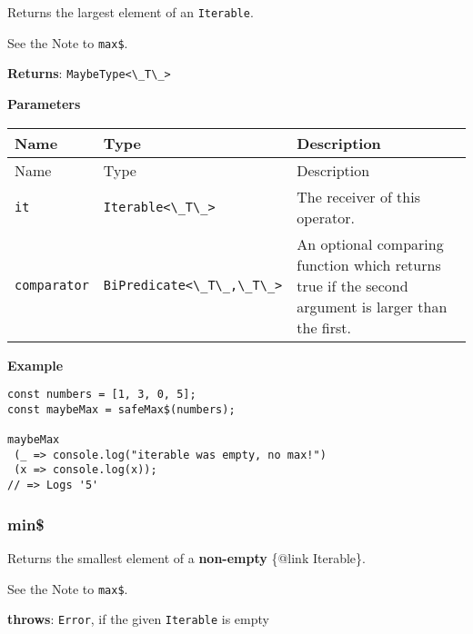 Returns the largest element of an \passthrough{\lstinline!Iterable!}.

See the Note to \passthrough{\lstinline!max$!}.

\textbf{Returns}: \passthrough{\lstinline!MaybeType<\_T\_>!}

\textbf{Parameters}

\begin{longtable}[]{
  >{\raggedright\arraybackslash}p{}
  >{\raggedright\arraybackslash}p{}
  >{\raggedright\arraybackslash}p{}@{}}

\toprule\noalign{}
Name & Type & Description \\
\midrule\noalign{}
\endfirsthead
\toprule\noalign{}
Name & Type & Description \\
\midrule\noalign{}
\endhead
\bottomrule\noalign{}
\endlastfoot
\passthrough{\lstinline!it!} & \passthrough{\lstinline!Iterable<\_T\_>!}
& The receiver of this operator. \\
\passthrough{\lstinline!comparator!} &
\passthrough{\lstinline!BiPredicate<\_T\_,\_T\_>!} & An optional
comparing function which returns true if the second argument is larger
than the first. \\
\end{longtable}

\textbf{Example}

\begin{lstlisting}[label=7b86eb50-6997-4099-a79d-0a699d114077]
const numbers = [1, 3, 0, 5];
const maybeMax = safeMax$(numbers);
                                                 
maybeMax
 (_ => console.log("iterable was empty, no max!")
 (x => console.log(x));
// => Logs '5'
\end{lstlisting}

\hypertarget{4262f292-d5a6-4e34-acfa-e4a74506c1c1}{%
\subsubsection{min\$}\label{4262f292-d5a6-4e34-acfa-e4a74506c1c1}}

Returns the smallest element of a \textbf{non-empty} \{@link Iterable\}.

See the Note to \passthrough{\lstinline!max$!}.

\textbf{throws}: \passthrough{\lstinline!Error!}, if the given
\passthrough{\lstinline!Iterable!} is empty

